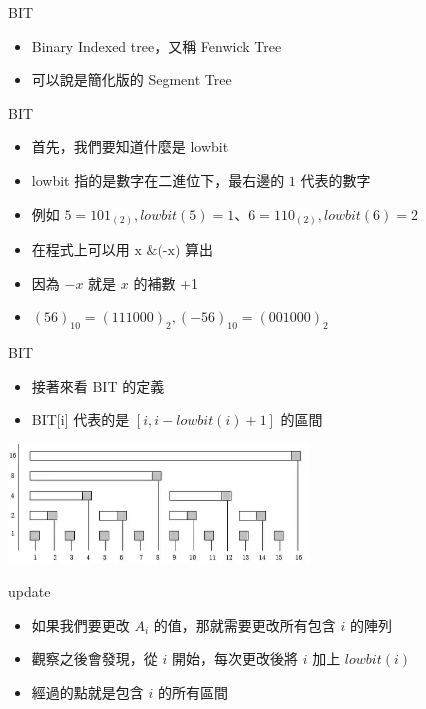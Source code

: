 \documentclass[aspectratio=169]{beamer}
\begin{document}
    \begin{frame}{BIT}
        \begin{itemize}
            \item Binary Indexed tree，又稱 Fenwick Tree
            \item 可以說是簡化版的 Segment Tree
        \end{itemize}
    \end{frame}

    \begin{frame}{BIT}
        \begin{itemize}
            \item 首先，我們要知道什麼是 lowbit
            \item lowbit 指的是數字在二進位下，最右邊的 $1$ 代表的數字
            \item 例如 $5 = 101_{(2)}, lowbit(5) = 1$、$6 = 110_{(2)}, lowbit(6) = 2$
            \item 在程式上可以用 $\text{x \& (-x)}$ 算出
            \item 因為 $-x$ 就是 $x$ 的補數 +1
            \item $
            (56)_{10} = (111000)_2,
            (-56)_{10} = (001000)_2$
        \end{itemize}
        
    \end{frame}

    \begin{frame}{BIT}
        \begin{itemize}
            \item 接著來看 BIT 的定義
            \item BIT[i] 代表的是 $[i, i - lowbit(i) + 1]$ 的區間
        \end{itemize}

        \includegraphics[width=0.6\textwidth]{img/BIT.png}
    \end{frame}

    \begin{frame}{update}
        \begin{itemize}
            \item 如果我們要更改 $A_i$ 的值，那就需要更改所有包含 $i$ 的陣列
            \item 觀察之後會發現，從 $i$ 開始，每次更改後將 $i$ 加上 $lowbit(i)$
            \item 經過的點就是包含 $i$ 的所有區間
        \end{itemize}
    \end{frame}
\end{document}
